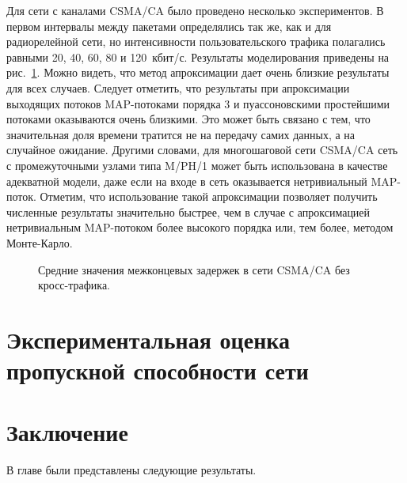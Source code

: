 Для сети с каналами CSMA/CA было проведено несколько экспериментов. В первом интервалы между пакетами определялись так же, как и для радиорелейной сети, но интенсивности пользовательского трафика полагались равными 20, 40, 60, 80 и 120~кбит/с. Результаты моделирования приведены на рис.~\ref{fig:ch4_dcf_delays_noct_1}. Можно видеть, что метод апроксимации дает очень близкие результаты для всех случаев. Следует отметить, что результаты при апроксимации выходящих потоков MAP-потоками порядка 3 и пуассоновскими простейшими потоками оказываются очень близкими. Это может быть связано с тем, что значительная доля времени тратится не на передачу самих данных, а на случайное ожидание. Другими словами, для многошаговой сети CSMA/CA сеть с промежуточными узлами типа M/PH/1 может быть использована в качестве адекватной модели, даже если на входе в сеть оказывается нетривиальный MAP-поток. Отметим, что использование такой апроксимации позволяет получить численные результаты значительно быстрее, чем в случае с апроксимацией нетривиальным MAP-потоком более высокого порядка или, тем более, методом Монте-Карло.

\begin{figure}[h]
  \caption{Средние значения межконцевых задержек в сети CSMA/CA без кросс-трафика.}
  \label{fig:ch4_dcf_delays_noct_1}
\end{figure}







\section{Экспериментальная оценка пропускной способности сети}\label{sec:ch4_stand_results}



\section{Заключение}\label{sec:ch4_conclusion}
В главе были представлены следующие результаты.

